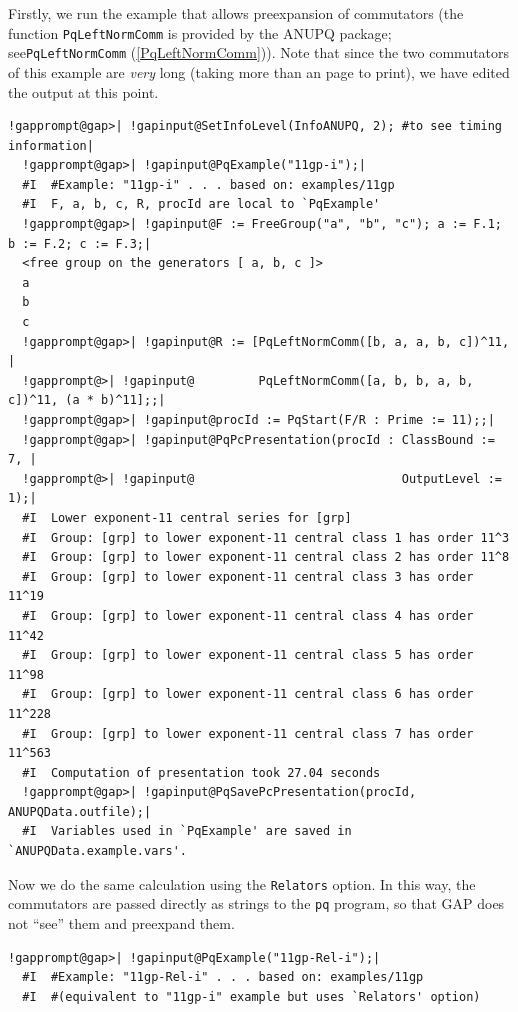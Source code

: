 \documentclass[a4paper,11pt]{report}
\begin{document}
{{ Firstly, we run the example that allows pre\texttt{}expansion of
commutators (the function \texttt{PqLeftNormComm} is provided by the \textsf{ANUPQ} package; see{\nobreakspace}\texttt{PqLeftNormComm} (\ref{PqLeftNormComm})). Note that since the two commutators of this example are \emph{very} long (taking more than an page to print), we have edited the output at this
point. 
\begin{Verbatim}[commandchars=!@|,fontsize=\small,frame=single,label=Example]
  !gapprompt@gap>| !gapinput@SetInfoLevel(InfoANUPQ, 2); #to see timing information|
  !gapprompt@gap>| !gapinput@PqExample("11gp-i");|
  #I  #Example: "11gp-i" . . . based on: examples/11gp
  #I  F, a, b, c, R, procId are local to `PqExample'
  !gapprompt@gap>| !gapinput@F := FreeGroup("a", "b", "c"); a := F.1; b := F.2; c := F.3;|
  <free group on the generators [ a, b, c ]>
  a
  b
  c
  !gapprompt@gap>| !gapinput@R := [PqLeftNormComm([b, a, a, b, c])^11, |
  !gapprompt@>| !gapinput@         PqLeftNormComm([a, b, b, a, b, c])^11, (a * b)^11];;|
  !gapprompt@gap>| !gapinput@procId := PqStart(F/R : Prime := 11);;|
  !gapprompt@gap>| !gapinput@PqPcPresentation(procId : ClassBound := 7, |
  !gapprompt@>| !gapinput@                             OutputLevel := 1);|
  #I  Lower exponent-11 central series for [grp]
  #I  Group: [grp] to lower exponent-11 central class 1 has order 11^3
  #I  Group: [grp] to lower exponent-11 central class 2 has order 11^8
  #I  Group: [grp] to lower exponent-11 central class 3 has order 11^19
  #I  Group: [grp] to lower exponent-11 central class 4 has order 11^42
  #I  Group: [grp] to lower exponent-11 central class 5 has order 11^98
  #I  Group: [grp] to lower exponent-11 central class 6 has order 11^228
  #I  Group: [grp] to lower exponent-11 central class 7 has order 11^563
  #I  Computation of presentation took 27.04 seconds
  !gapprompt@gap>| !gapinput@PqSavePcPresentation(procId, ANUPQData.outfile);|
  #I  Variables used in `PqExample' are saved in `ANUPQData.example.vars'.
\end{Verbatim}
 Now we do the same calculation using the \texttt{Relators} option. In this way, the commutators are passed directly as strings to the \texttt{pq} program, so that \textsf{GAP} does not ``see'' them and pre\texttt{}expand them. 
\begin{Verbatim}[commandchars=!@|,fontsize=\small,frame=single,label=Example]
  !gapprompt@gap>| !gapinput@PqExample("11gp-Rel-i");|
  #I  #Example: "11gp-Rel-i" . . . based on: examples/11gp
  #I  #(equivalent to "11gp-i" example but uses `Relators' option)

\end{Verbatim}}}
\end{document}
